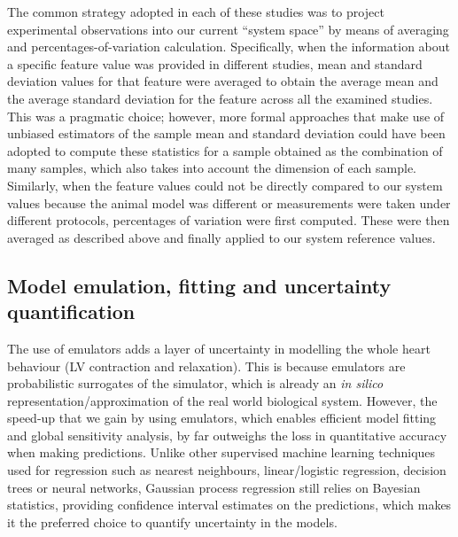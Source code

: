\vspace{0.2cm}
The common strategy adopted in each of these studies was to project experimental observations into our current ``system space'' by means of averaging and percentages-of-variation calculation. Specifically, when the information about a specific feature value was provided in different studies, mean and standard deviation values for that feature were averaged to obtain the average mean and the average standard deviation for the feature across all the examined studies. This was a pragmatic choice; however, more formal approaches that make use of unbiased estimators of the sample mean and standard deviation could have been adopted to compute these statistics for a sample obtained as the combination of many samples, which also takes into account the dimension of each sample. Similarly, when the feature values could not be directly compared to our system values because the animal model was different or measurements were taken under different protocols, percentages of variation were first computed. These were then averaged as described above and finally applied to our system reference values.


%
%
%
\subsection{Model emulation, fitting and uncertainty quantification}\label{sec:ch9model_emulation_fitting_and_uncertainty_quantification}The use of emulators adds a layer of uncertainty in modelling the whole heart behaviour (LV contraction and relaxation). This is because emulators are probabilistic surrogates of the simulator, which is already an \textit{in silico} representation/approximation of the real world biological system. However, the speed-up that we gain by using emulators, which enables efficient model fitting and global sensitivity analysis, by far outweighs the loss in quantitative accuracy when making predictions. Unlike other supervised machine learning techniques used for regression such as nearest neighbours, linear/logistic regression, decision trees or neural networks, Gaussian process regression still relies on Bayesian statistics, providing confidence interval estimates on the predictions, which makes it the preferred choice to quantify uncertainty in the models.

